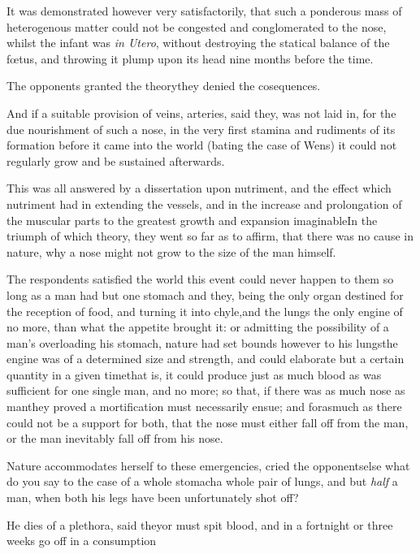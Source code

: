 \documentclass{article}
\begin{document}
It was demonstrated however very satisfactorily, that such a ponderous mass of
heterogenous matter could not be congested and conglomerated to the
nose, whilst the infant was \textit{in Utero}, without destroying the
statical balance of the fœtus, and throwing it plump upon its
head nine months before the time.\tsh

\tsk The opponents granted the theory\tsk\break they
denied the cosequences.

And if a suitable provision of veins, arteries, \etc said
they, was not laid in, for the due nourishment of such a nose, in
the very first stamina and rudiments of its formation  before it
came into the world (bating the case of Wens) it could not
regularly grow and be sustained afterwards.

This was all answered by a dissertation upon nutriment, and the
effect which nutriment had in extending the vessels, and in the
increase and prolongation of the muscular parts to the greatest
growth and expansion imaginable\tsk In the triumph of which
theory, they went so far as to affirm, that there was no cause
in nature, why a nose might not grow to the size of the
man himself.

The respondents satisfied the world this event could never
happen to them so long as a man had but one stomach and
they, being the
only organ destined for the reception of food, and turning
it into chyle,\tsk and the lungs the only engine of
no more, than
what the appetite brought it: or admitting the possibility
of a man’s overloading his stomach, nature had set bounds
however to his lungs\tsk the engine was of a determined size
and strength, and could elaborate but a certain quantity in
a given time\tsk that is, it could produce just as much
blood as was sufficient for one single man, and no more; so
that, if there was as much nose as man\tsk they proved a
mortification must necessarily ensue; and forasmuch as there
could not be a support for both, that the nose must either
fall off from the man, or the man inevitably fall off from
his nose.

Nature accommodates herself to these emergencies, cried the
opponents\tsk else what do you say to the case of a whole
stomach\tsk a whole pair of lungs, and but \textit{half} a man, when both
his legs have been unfortunately shot off?\tsk

He dies of a plethora, said they\tsk or must spit blood, and
in a fortnight or three weeks go off in a
consumption\tsk
\end{document}
